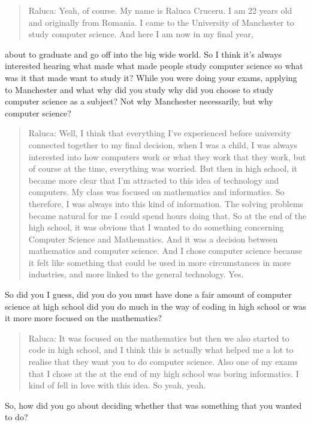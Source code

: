 \documentclass[
]{book}
\begin{document}
\begin{quote}
Raluca: Yeah, of course. My name is Raluca Cruceru. I am 22 years old and originally from Romania. I came to the University of Manchester to study computer science. And here I am now in my final year,
\end{quote}

about to graduate and go off into the big wide world. So I think it's always interested hearing what made what made people study computer science so what was it that made want to study it? While you were doing your exams, applying to Manchester and what why did you study why did you choose to study computer science as a subject? Not why Manchester necessarily, but why computer science?

\begin{quote}
Raluca: Well, I think that everything I've experienced before university connected together to my final decision, when I was a child, I was always interested into how computers work or what they work that they work, but of course at the time, everything was worried. But then in high school, it became more clear that I'm attracted to this idea of technology and computers. My class was focused on mathematics and informatics. So therefore, I was always into this kind of information. The solving problems became natural for me I could spend hours doing that. So at the end of the high school, it was obvious that I wanted to do something concerning Computer Science and Mathematics. And it was a decision between mathematics and computer science. And I chose computer science because it felt like something that could be used in more circumstances in more industries, and more linked to the general technology. Yes.
\end{quote}

So did you I guess, did you do you must have done a fair amount of computer science at high school did you do much in the way of coding in high school or was it more more focused on the mathematics?

\begin{quote}
Raluca: It was focused on the mathematics but then we also started to code in high school, and I think this is actually what helped me a lot to realise that they want you to do computer science. Also one of my exams that I chose at the at the end of my high school was boring informatics. I kind of fell in love with this idea. So yeah, yeah.
\end{quote}

So, how did you go about deciding whether that was something that you wanted to do?
\end{document}
